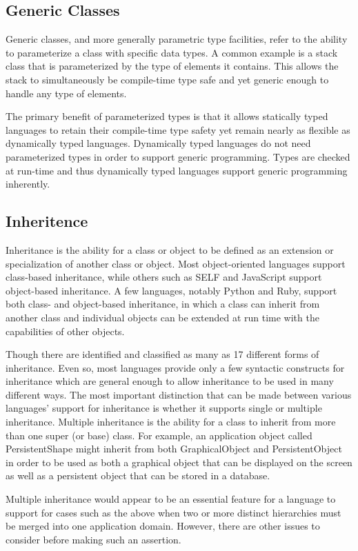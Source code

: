 \documentclass[12pt,a4paper,final,twoside,titlepage]{book}
\begin{document}
\subsection{Generic Classes}
Generic classes, and more generally parametric type facilities, refer to the ability to parameterize a class with specific data types. A common example is a stack class that is parameterized by the type of elements it contains. This allows the stack to simultaneously be compile-time type safe and yet generic enough to handle any type of elements.

The primary benefit of parameterized types is that it allows statically typed languages to retain their compile-time type safety yet remain nearly as flexible as dynamically typed languages. Dynamically typed languages do not need parameterized types in order to support generic programming. Types are checked at run-time and thus dynamically typed languages support generic programming inherently.

\subsection{Inheritence}
Inheritance is the ability for a class or object to be defined as an extension or specialization of another class or object. Most object-oriented languages support class-based inheritance, while others such as SELF and JavaScript support object-based inheritance. A few languages, notably Python and Ruby, support both class- and object-based inheritance, in which a class can inherit from another class and individual objects can be extended at run time with the capabilities of other objects. 

Though there are identified and classified as many as 17 different forms of inheritance. Even so, most languages provide only a few syntactic constructs for inheritance which are general enough to allow inheritance to be used in many different ways. The most important distinction that can be made between various languages' support for inheritance is whether it supports single or multiple inheritance. Multiple inheritance is the ability for a class to inherit from more than one super (or base) class. For example, an application object called PersistentShape might inherit from both GraphicalObject and PersistentObject in order to be used as both a graphical object that can be displayed on the screen as well as a persistent object that can be stored in a database.

Multiple inheritance would appear to be an essential feature for a language to support for cases such as the above when two or more distinct hierarchies must be merged into one application domain. However, there are other issues to consider before making such an assertion.
\end{document}
